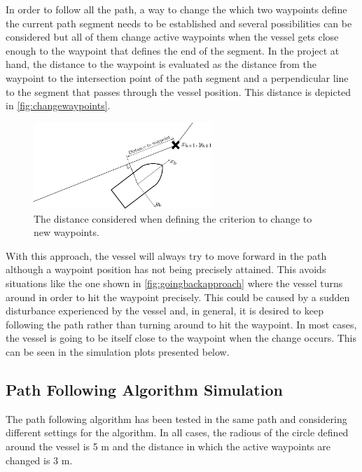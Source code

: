 In order to follow all the path, a way to change the which two waypoints define the current path segment needs to be established and several possibilities can be considered but all of them change active waypoints when the vessel gets close enough to the waypoint that defines the end of the segment. In the project at hand, the distance to the waypoint is evaluated as the distance from the waypoint to the intersection point of the path segment and a perpendicular line to the segment that passes through the vessel position. This distance is depicted in \autoref{fig:changewaypoints}.
\begin{figure}[H]
	\includegraphics[width=0.6\textwidth]{figures/LOSalgorithmdistancewp}
	\caption{The distance considered when defining the criterion to change to new waypoints.}
	\label{fig:changewaypoints}
\end{figure}
With this approach, the vessel will always try to move forward in the path although a waypoint position has not being precisely attained. This avoids situations like the one shown in \autoref{fig:goingbackapproach} where the vessel turns around in order to hit the waypoint precisely. This could be caused by a sudden disturbance experienced by the vessel and, in general, it is desired to keep following the path rather than turning around to hit the waypoint. In most cases, the vessel is going to be itself close to the waypoint when the change occurs. This can be seen in the simulation plots presented below. 

\subsection{Path Following Algorithm Simulation}

 

The path following algorithm has been tested in the same path and considering different settings for the algorithm. In all cases, the radious of the circle defined around the vessel is 5 m and the distance in which the active waypoints are changed is 3 m. 

